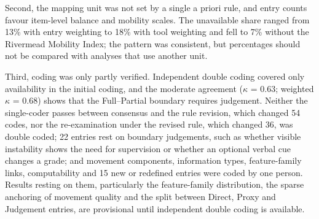 \documentclass[11pt]{article}
\begin{document}
Second, the mapping unit was not set by a single a priori rule, and entry counts favour item-level balance and mobility scales. The unavailable share ranged from 13\% with entry weighting to 18\% with tool weighting and fell to 7\% without the Rivermead Mobility Index; the pattern was consistent, but percentages should not be compared with analyses that use another unit.

Third, coding was only partly verified. Independent double coding covered only availability in the initial coding, and the moderate agreement ($\kappa$ = 0.63; weighted $\kappa$ = 0.68) shows that the Full--Partial boundary requires judgement. Neither the single-coder passes between consensus and the rule revision, which changed 54 codes, nor the re-examination under the revised rule, which changed 36, was double coded; 22 entries rest on boundary judgements, such as whether visible instability shows the need for supervision or whether an optional verbal cue changes a grade; and movement components, information types, feature-family links, computability and 15 new or redefined entries were coded by one person. Results resting on them, particularly the feature-family distribution, the sparse anchoring of movement quality and the split between Direct, Proxy and Judgement entries, are provisional until independent double coding is available.
\end{document}
